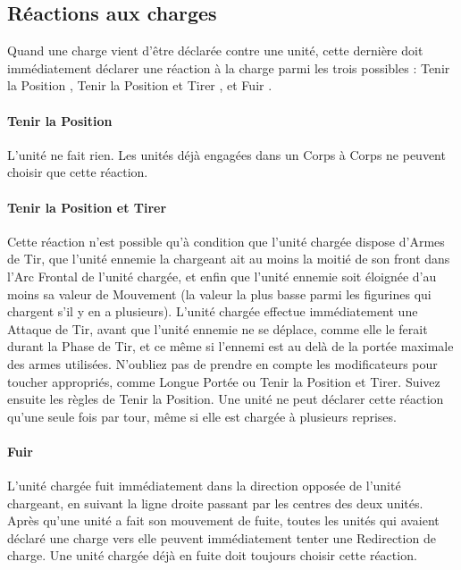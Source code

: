 \newpage
\hypertarget{chargereaction}{\subsection{Réactions aux charges}}
\label{chargereaction}

Quand une charge vient d'être déclarée contre une unité, cette dernière doit immédiatement déclarer une réaction à la charge parmi les trois possibles : \og Tenir la Position \fg{}, \og Tenir la Position et Tirer \fg{}, et \og Fuir \fg{}.

\paragraph{Tenir la Position}

L'unité ne fait rien. Les unités déjà engagées dans un Corps à Corps ne peuvent choisir que cette réaction.

\paragraph{Tenir la Position et Tirer}

Cette réaction n'est possible qu'à condition que l'unité chargée dispose d'Armes de Tir, que l'unité ennemie la chargeant ait au moins la moitié de son front dans l'Arc Frontal de l'unité chargée, et enfin que l'unité ennemie soit éloignée d'au moins sa valeur de Mouvement (la valeur la plus basse parmi les figurines qui chargent s'il y en a plusieurs). L'unité chargée effectue immédiatement une Attaque de Tir, avant que l'unité ennemie ne se déplace, comme elle le ferait durant la Phase de Tir, et ce même si l'ennemi est au delà de la portée maximale des armes utilisées. N'oubliez pas de prendre en compte les modificateurs pour toucher appropriés, comme Longue Portée ou Tenir la Position et Tirer. Suivez ensuite les règles de Tenir la Position. Une unité ne peut déclarer cette réaction qu'une seule fois par tour, même si elle est chargée à plusieurs reprises.

\paragraph{Fuir}

L'unité chargée fuit immédiatement dans la direction opposée de l'unité chargeant, en suivant la ligne droite passant par les centres des deux unités. Après qu'une unité a fait son mouvement de fuite, toutes les unités qui avaient déclaré une charge vers elle peuvent immédiatement tenter une Redirection de charge. Une unité chargée déjà en fuite doit toujours choisir cette réaction.

